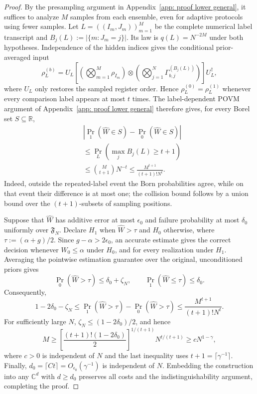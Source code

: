 \documentclass[aps,prx,reprint,superscriptaddress,amsmath,amssymb,longbibliography,floatfix]{revtex4-2}
\theoremstyle{plain}
\theoremstyle{definition}
\theoremstyle{remark}
\begin{document}
\begin{proof}
By the presampling argument in Appendix~\ref{app: proof lower general}, it suffices to analyze $M$ samples from each ensemble, even for adaptive protocols using fewer samples. Let $L=((I_m,J_m))_{m=1}^M$ be the complete numerical label transcript and $B_j(L):=|\{m:J_m=j\}|$. Its law is $q(L)=N^{-2M}$ under both hypotheses. Independence of the hidden indices gives the conditional prior-averaged input
\begin{equation}
\rho_L^{(b)}=U_L\left[\left(\bigotimes_{m=1}^M\rho_{I_m}\right)\otimes\left(\bigotimes_{j=1}^N\Gamma_{b,j}^{(B_j(L))}\right)\right]U_L^\dagger,
\label{eq:app-wasserstein-conditional-input}
\end{equation}
where $U_L$ only restores the sampled register order. Hence $\rho_L^{(0)}=\rho_L^{(1)}$ whenever every comparison label appears at most $t$ times. The label-dependent POVM argument of Appendix~\ref{app: proof lower general} therefore gives, for every Borel set $S\subseteq\mathbb R$,
\begin{equation}
\begin{aligned}
&\left|\Pr_1(\widehat W\in S)-\Pr_0(\widehat W\in S)\right|\\
&\le\Pr_L\!\left(\max_jB_j(L)\ge t+1\right)\\
&\le\binom M{t+1}N^{-t}\le\frac{M^{t+1}}{(t+1)!N^t}.
\end{aligned}
\label{eq:app-wasserstein-testing-advantage}
\end{equation}
Indeed, outside the repeated-label event the Born probabilities agree, while on that event their difference is at most one; the collision bound follows by a union bound over the $(t+1)$-subsets of sampling positions.

Suppose that $\widehat W$ has additive error at most $\epsilon_0$ and failure probability at most $\delta_0$ uniformly over $\mathfrak F_N$. Declare $H_1$ when $\widehat W>\tau$ and $H_0$ otherwise, where $\tau:=(\alpha+g)/2$. Since $g-\alpha>2\epsilon_0$, an accurate estimate gives the correct decision whenever $W_0\le\alpha$ under $H_0$, and for every realization under $H_1$. Averaging the pointwise estimation guarantee over the original, unconditioned priors gives
\[
\Pr_0(\widehat W>\tau)\le\delta_0+\zeta_N,\qquad \Pr_1(\widehat W\le\tau)\le\delta_0.
\]
Consequently,
\[
1-2\delta_0-\zeta_N\le\Pr_1(\widehat W>\tau)-\Pr_0(\widehat W>\tau)\le\frac{M^{t+1}}{(t+1)!N^t}.
\]
For sufficiently large $N$, $\zeta_N\le(1-2\delta_0)/2$, and hence
\begin{equation}
M\ge\left[\frac{(t+1)!(1-2\delta_0)}2\right]^{1/(t+1)}N^{t/(t+1)}\ge cN^{1-\gamma},
\label{eq:app-wasserstein-sample-lower}
\end{equation}
where $c>0$ is independent of $N$ and the last inequality uses $t+1=\lceil\gamma^{-1}\rceil$. Finally, $d_0=\lceil Ct\rceil=O_{\epsilon_0}(\gamma^{-1})$ is independent of $N$. Embedding the construction into any $\mathbb C^d$ with $d\ge d_0$ preserves all costs and the indistinguishability argument, completing the proof.


\end{proof}
\end{document}
